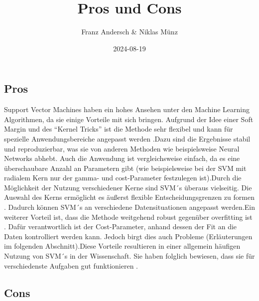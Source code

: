\documentclass[
]{article}
\title{Pros und Cons}
\author{Franz Andersch \& Niklas Münz}
\date{2024-08-19}
\renewcommand{\maketitle}{}
\begin{document}
\maketitle

\subsection{Pros}

Support Vector Machines haben ein hohes Ansehen unter den Machine
Learning Algorithmen, da sie einige Vorteile mit sich bringen. Aufgrund
der Idee einer Soft Margin und des ``Kernel Tricks'' ist die Methode
sehr flexibel und kann für spezielle Anwendungsbereiche angepasst werden
\parencite{bennettSupportVectorMachines2000}.Dazu sind die Ergebnisse
stabil und reproduzierbar, was sie von anderen Methoden wie
beispielsweise Neural Networks abhebt. Auch die Anwendung ist
vergleichsweise einfach, da es eine überschaubare Anzahl an Parametern
gibt (wie beispielsweise bei der SVM mit radialem Kern nur der gamma-
und cost-Parameter festzulegen ist).\newline Durch die Möglichkeit der
Nutzung verschiedener Kerne sind SVM´s überaus vielseitig. Die Auswahl
des Kerns ermöglicht es äußerst flexible Entscheidungsgrenzen zu formen
\parencite{kuhnAppliedPredictiveModeling2013}. Dadurch können SVM´s an
verschiedene Datensituationen angepasst werden.\newline Ein weiterer
Vorteil ist, dass die Methode weitgehend robust gegenüber overfitting
ist \parencite{kuhnAppliedPredictiveModeling2013}. Dafür verantwortlich
ist der Cost-Parameter, anhand dessen der Fit an die Daten kontrolliert
werden kann. Jedoch birgt dies auch Probleme (Erläuterungen im folgenden
Abschnitt).\newline Diese Vorteile resultieren in einer allgemein
häufigen Nutzung von SVM´s in der Wissenschaft. Sie haben folglich
bewiesen, dass sie für verschiedenste Aufgaben gut funktionieren
\parencite{kuhnAppliedPredictiveModeling2013}.

\subsection{Cons}
\end{document}
